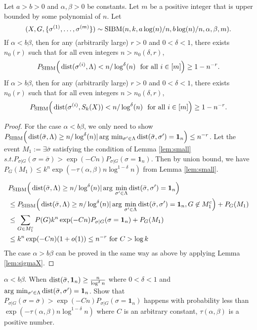 \documentclass{article}
\begin{document}
\begin{proposition} \label{prop:1}
Let $a>b>0$ and $\alpha,\beta>0$ be constants. Let $m$ be a positive integer that is upper bounded by some polynomial of $n$.
Let 
$$
(X,G,\{\sigma^{(1)},\dots,\sigma^{(m)}\})\sim \operatorname{SIBM}(n,k, a\log(n)/n, b\log(n)/n, \alpha,\beta, m) .
$$
If $\alpha < b\beta$, then for any (arbitrarily large) $r>0$ and $0<\delta<1$, there exists $n_0(r)$ such that for all even integers $n>n_0(\delta, r)$,
$$
P_{\operatorname{SIBM}} \Big(\operatorname{dist}(\sigma^{(i)}, \Lambda)< n/\log^{\delta}(n)
\text{~~for all~} i\in[m] \Big) \ge 1- n^{-r} .
$$
If $\alpha > b\beta$, then for any (arbitrarily large) $r>0$ and $0<\delta<1$, there exists $n_0(r)$ such that for all even integers $n>n_0(\delta, r)$,
$$
P_{\operatorname{SIBM}} \Big(\operatorname{dist}(\sigma^{(i)}, S_k(X)) < n/\log^{\delta}(n)
\text{~~for all~} i\in[m] \Big) \ge 1- n^{-r} .
$$
\end{proposition}
\begin{proof}
For the case $\alpha < b \beta$, we only need to show $P_{\operatorname{SIBM}} \Big(\operatorname{dist}(\bar{\sigma}, \Lambda)\geq n/\log^{\delta}(n)
| \arg\,\min_{\sigma'\in \Lambda} \operatorname{dist}(\bar{\sigma}, \sigma') = \mathbf{1}_n
 \Big) \leq n^{-r}$.
 Let the event $M_1:= \exists \bar{\sigma}$ satisfying the condition of Lemma \ref{lem:small}
  $s.t. P_{\sigma | G}(\sigma = \bar{\sigma} ) > \exp(-Cn) P_{\sigma | G}(\sigma = \mathbf{1}_n)$.
 Then by union bound, we have $P_{G}(M_1) \leq k^n\exp(-\tau(\alpha, \beta )n \log^{1-\delta} n )$ from Lemma \ref{lem:small}.
 
\begin{align*}
&P_{\operatorname{SIBM}} \Big(\operatorname{dist}(\bar{\sigma}, \Lambda)\geq n/\log^{\delta}(n)
| \arg\,\min_{\sigma'\in \Lambda} \operatorname{dist}(\bar{\sigma}, \sigma') = \mathbf{1}_n \Big) \\
&\leq
P_{\operatorname{SIBM}} \Big(\operatorname{dist}(\bar{\sigma}, \Lambda)\geq n/\log^{\delta}(n)
| \arg\,\min_{\sigma'\in \Lambda} \operatorname{dist}(\bar{\sigma}, \sigma')= \mathbf{1}_n, G \not\in M_1^c\Big) + P_G(M_1) \\
&\leq \sum_{G \in M_1^c} P(G) k^n \exp(-Cn)P_{\sigma|G}(\sigma=\mathbf{1}_n) + P_G(M_1) \\
& \leq k^n \exp(-Cn) (1 + o(1)) \leq n^{-r} \textrm{ for } C> \log k
\end{align*}
The case $\alpha > b \beta$ can be proved in the same way as above by applying Lemma \ref{lem:sigmaX}.
\end{proof}
\begin{lemma}\label{lem:small}
	$\alpha< b \beta$. When $\operatorname{dist}(\bar{\sigma}, \mathbf{1}_n) \geq \frac{n}{\log^{\delta} n}$ where $0<\delta < 1$ and $\arg\,\min_{\sigma'\in \Lambda} \operatorname{dist}(\bar{\sigma}, \sigma') = \mathbf{1}_n$. Show that
	$P_{\sigma | G}(\sigma = \bar{\sigma} ) > \exp(-Cn) P_{\sigma | G}(\sigma = \mathbf{1}_n)$
	happens with probability less than $\exp(-\tau(\alpha,\beta) n \log^{1-\delta} n )$ where $C$ is an arbitrary constant, $\tau(\alpha,\beta)$ is a positive number.
\end{lemma}
\end{document}
